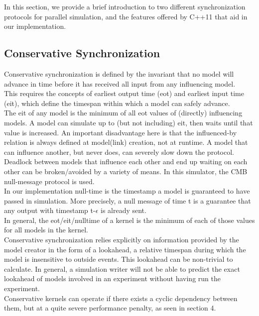 In this section, we provide a brief introduction to two different synchronization protocols for parallel simulation, and the features offered by C++11 that aid in our implementation.

\subsection{Conservative Synchronization}
Conservative synchronization is defined by the invariant that no model will advance in time before it has received all input from any influencing model. \\
This requires the concepts of earliest output time (eot) and earliest input time (eit), which define the timespan within which a model can safely advance. \\ The eit of any model is the minimum of all eot values of (directly) influencing models. A model can simulate up to (but not including) eit, then waits until that value is increased. An important disadvantage here is that the influenced-by relation is always defined at model(link) creation, not at runtime. A model that can influence another, but never does, can severely slow down the protocol.\\ 
Deadlock between models that influence each other and end up waiting on each other can be broken/avoided by a variety of means. In this simulator, the CMB \cite{Chandy:1981:ADS:358598.358613} null-message protocol is used. \\
In our implementation null-time is the timestamp a model is guaranteed to have passed in simulation. More precisely, a null message of time t is a guarantee that any output with timestamp t-$\epsilon$ is already sent.\\
In general, the eot/eit/nulltime of a kernel is the minimum of each of those values for all models in the kernel.\\
Conservative synchronization relies explicitly on information provided by the model creator in the form of a lookahead, a relative timespan during which the model is insensitive to outside events. This lookahead can be non-trivial to calculate. In general, a simulation writer will not be able to predict the exact lookahead of models involved in an experiment without having run the experiment.\\ Conservative kernels can operate if there exists a cyclic dependency between them, but at a quite severe performance penalty, as seen in section 4.
